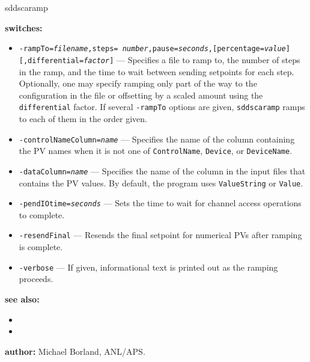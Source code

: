 \begin{sddsprog}{sddscaramp}
\item \textbf{switches:}
\begin{itemize}
  \item {\tt -rampTo={\em filename},steps={\em
        number},pause={\em seconds},[percentage={\em value}][,differential={\em factor}]} ---
        Specifies a file to ramp to, the number of steps in the ramp,
        and the time to wait between sending setpoints for each step.
        Optionally, one may specify ramping only part of the way to
        the configuration in the file or offsetting by a scaled
        amount using the {\tt differential} factor.  If several
        {\tt -rampTo} options are given, {\tt sddscaramp} ramps to each
        of them in the order given.
  \item {\tt -controlNameColumn={\em name}} --- Specifies the
        name of the column containing the PV names when it is not
        one of {\tt ControlName}, {\tt Device}, or {\tt DeviceName}.
  \item {\tt -dataColumn={\em name}} --- Specifies the name of
        the column in the input files that contains the PV values.
        By default, the program uses {\tt ValueString} or {\tt Value}.
  \item {\tt -pendIOtime={\em seconds}} --- Sets the time to
        wait for channel access operations to complete.
  \item {\tt -resendFinal} --- Resends the final setpoint for
        numerical PVs after ramping is complete.
  \item {\tt -verbose} --- If given, informational text is
        printed out as the ramping proceeds.
\end{itemize}

\item \textbf{see also:}
\begin{itemize}
  \item {}
  \item {}
\end{itemize}
\item \textbf{author:} Michael Borland, ANL/APS.
\end{sddsprog}
